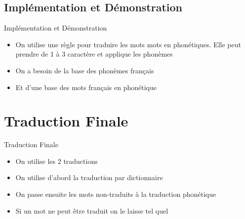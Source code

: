 \documentclass{beamer}
\begin{document}
\subsection{Implémentation et Démonstration}
\begin{frame}{Implémentation et Démonstration}
	\begin{itemize}
	\item On utilise une règle pour traduire les mots mots en phonétiques. Elle peut prendre de 1 à 3 caractère et applique les phonèmes
	\item On a besoin de la base des phonèmes français
	\item Et d'une base des mots français en phonétique
	\end{itemize}
\end{frame}

\section{Traduction Finale}
\begin{frame}{Traduction Finale}
	\begin{itemize}
		\item On utilise les 2 traductions
		\item On utilise d'abord la traduction par dictionnaire
		\item On passe ensuite les mots non-traduits à la traduction phonétique
		\item Si un mot ne peut être traduit on le laisse tel quel
	\end{itemize}
\end{frame}
\end{document}
